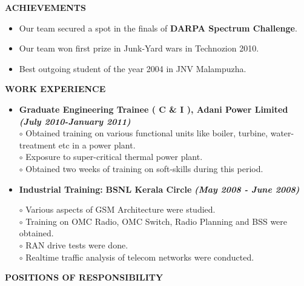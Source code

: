 \documentclass[a4paper,10pt]{article}
\begin{document}
 \colorbox{titleColor}{\parbox{6.5in}{\textbf{ACHIEVEMENTS}}}

 \begin{itemize}
  \item Our team secured a spot in the finals of \textbf{DARPA Spectrum Challenge}.
  \item Our team won first prize in Junk-Yard wars in Technozion 2010.
  \item Best outgoing student of the year 2004 in JNV Malampuzha.
  \end{itemize}

 \colorbox{titleColor}{\parbox{6.5in}{\textbf{WORK EXPERIENCE}}}

 \begin{itemize}
 \setlength{\itemsep}{1pt}
 \item \textbf{Graduate Engineering Trainee ( C \& I ), Adani Power Limited}  \textbf \emph{(July 2010-January 2011)}\\ 
 $\circ$ Obtained training on various functional units like boiler, turbine, water-treatment etc in a power plant.\\
 $\circ$ Exposure to super-critical thermal power plant. \\
 $\circ$ Obtained two weeks of training on soft-skills during this period.
 
   \item \textbf{Industrial Training:} \textbf{BSNL Kerala Circle}  \textbf \emph{(May 2008 - June 2008)}        

  $\circ$ Various aspects of GSM Architecture were studied. \\
  $\circ$ Training on OMC Radio, OMC Switch, Radio Planning and BSS were obtained. \\
  $\circ$ RAN drive tests were done. \\
  $\circ$ Realtime traffic analysis of telecom networks were conducted.

\end{itemize}

 \colorbox{titleColor}{\parbox{6.5in}{\textbf{POSITIONS OF RESPONSIBILITY}}}
\end{document}
